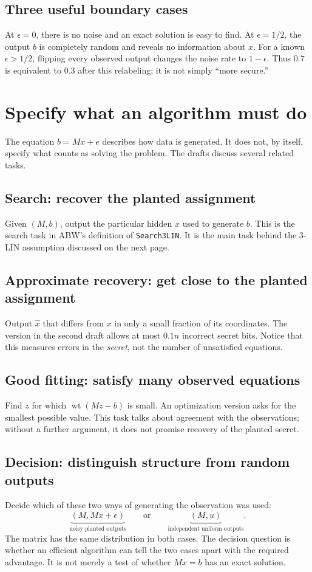 \documentclass[11pt,a4paper]{article}
\newcommand{\wt}{\operatorname{wt}}
\begin{document}
\subsection*{Three useful boundary cases}
At $\epsilon=0$, there is no noise and an exact solution is easy to find. At $\epsilon=1/2$, the output $b$ is completely random and reveals no information about $x$. For a known $\epsilon>1/2$, flipping every observed output changes the noise rate to $1-\epsilon$. Thus $0.7$ is equivalent to $0.3$ after this relabeling; it is not simply ``more secure.''~\cite{draft2}

\newpage
\section{Specify what an algorithm must do}
The equation $b=Mx+e$ describes how data is generated. It does not, by itself, specify what counts as solving the problem. The drafts discuss several related tasks.~\cite{draft2}

\subsection*{Search: recover the planted assignment}
Given $(M,b)$, output the particular hidden $x$ used to generate $b$. This is the search task in ABW's definition of \texttt{Search3LIN}. It is the main task behind the 3-LIN assumption discussed on the next page.

\subsection*{Approximate recovery: get close to the planted assignment}
Output $\widehat x$ that differs from $x$ in only a small fraction of its coordinates. The version in the second draft allows at most $0.1n$ incorrect secret bits. Notice that this measures errors in the \emph{secret}, not the number of unsatisfied equations.

\subsection*{Good fitting: satisfy many observed equations}
Find $z$ for which $\wt(Mz-b)$ is small. An optimization version asks for the smallest possible value. This task talks about agreement with the observations; without a further argument, it does not promise recovery of the planted secret.

\subsection*{Decision: distinguish structure from random outputs}
Decide which of these two ways of generating the observation was used:
\[
\underbrace{(M,Mx+e)}_{\text{noisy planted outputs}}
\qquad\text{or}\qquad
\underbrace{(M,u)}_{\text{independent uniform outputs}}.
\]
The matrix has the same distribution in both cases. The decision question is whether an efficient algorithm can tell the two cases apart with the required advantage. It is not merely a test of whether $Mx=b$ has an exact solution.
\end{document}
